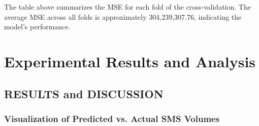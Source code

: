 \documentclass[12pt]{book} %
\begin{document}
The table above summarizes the MSE for each fold of the cross-validation. The average MSE across all folds is approximately 304,239,307.76, indicating the model's performance. 











\chapter{Experimental Results and Analysis}






\section{RESULTS and DISCUSSION}
\subsection{Visualization of Predicted vs. Actual SMS Volumes}
\end{document}
